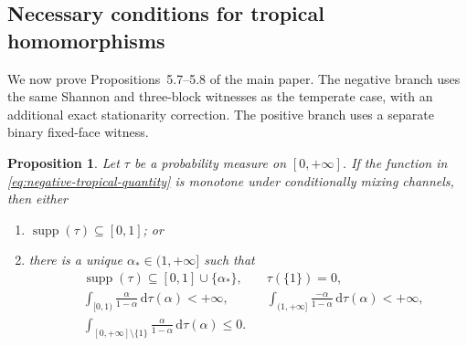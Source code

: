 \documentclass[aps,pra,11pt,onecolumn,nofootinbib,tightenlines]{revtex4-2}
\newtheorem{proposition}[theorem]{Proposition}
\theoremstyle{definition}
\begin{document}
\subsection{Necessary conditions for tropical homomorphisms}
\label{sec:tropical-necessity}

We now prove Propositions~5.7--5.8 of the main paper.  The negative
branch uses the same Shannon and three-block witnesses as the temperate case,
with an additional exact stationarity correction.  The positive branch uses a
separate binary fixed-face witness.

\begin{proposition}
\label{prop:negative-tropical-necessary}
Let $\tau$ be a probability measure on $[0,+\infty]$.  If the function in
\eqref{eq:negative-tropical-quantity} is monotone under conditionally mixing
channels, then either
\begin{enumerate}
 \item $\operatorname{supp}(\tau)\subseteq[0,1]$; or
 \item there is a unique $\alpha_*\in(1,+\infty]$ such that
 \begin{equation}
  \begin{aligned}
  &\operatorname{supp}(\tau)\subseteq[0,1]\cup\{\alpha_*\},
  &&\tau(\{1\})=0,\\
  &\int_{[0,1)}\frac{\alpha}{1-\alpha}\,\mathrm d\tau(\alpha)<+\infty,
  &&\int_{(1,+\infty]}\frac{-\alpha}{1-\alpha}\,\mathrm d\tau(\alpha)<+\infty,\\
  &\int_{[0,+\infty]\setminus\{1\}}
  \frac{\alpha}{1-\alpha}\,\mathrm d\tau(\alpha)\leq0.
  \end{aligned}
  \label{eq:negative-tropical-necessary-condition}
 \end{equation}
\end{enumerate}
\end{proposition}
\end{document}
